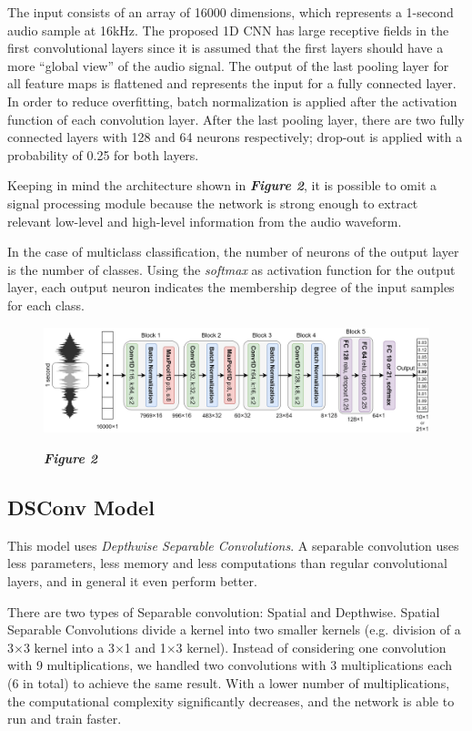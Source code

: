 \documentclass[conference]{IEEEtran}
\begin{document}
The input consists of an array of 16000 dimensions, which represents a 1-second audio sample at 16kHz.
The proposed 1D CNN has large receptive fields in the first convolutional layers since it is assumed that the first layers should have a more “global view” of the audio signal. The output of the last pooling layer for all feature maps is flattened and represents the input for a fully connected layer. In order to reduce overfitting, batch normalization is applied after the activation function of each convolution layer. After the last pooling layer, there are two fully connected layers with 128 and 64 neurons respectively; drop-out is applied with a probability of 0.25 for both layers.

Keeping in mind the architecture shown in \textbf{\textit{Figure 2}}, it is possible to omit a signal processing module because the network is strong enough to extract relevant low-level and high-level information from the audio waveform.

In the case of multiclass classification, the number of neurons of the output layer is the number of classes. Using the \textit{softmax} as activation function for the output layer, each output neuron indicates the membership degree of the input samples for each class.

\begin{figure}
\includegraphics[scale=0.16]{1DCNN}
\begin{small}\textit{\textbf{Figure 2}}
\end{small}
\end{figure}

\subsection{DSConv Model}
This model uses \textit{Depthwise Separable Convolutions}. A separable convolution uses less parameters, less memory and less computations than regular convolutional layers, and in general it even perform better.

There are two types of Separable convolution: Spatial and Depthwise.
Spatial Separable Convolutions divide a kernel into two smaller kernels (e.g. division of a 3$\times$3 kernel into a 3$\times$1 and 1$\times$3 kernel). Instead of considering one convolution with 9 multiplications, we handled two convolutions with 3 multiplications each (6 in total) to achieve the same result. With a lower number of multiplications, the computational complexity significantly decreases, and the network is able to run and train faster.
\end{document}
